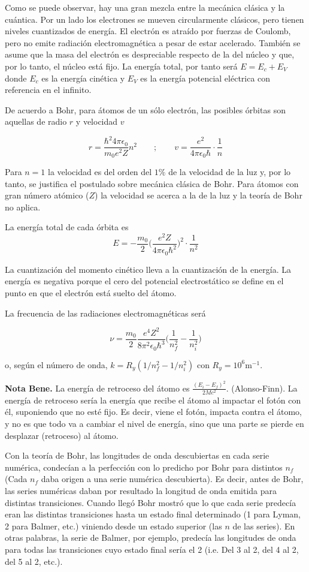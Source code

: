 \documentclass{article}
\begin{document}
Como se puede observar, hay una gran mezcla entre la mecánica clásica y la cuántica. Por un lado los electrones se mueven circularmente clásicos, pero tienen niveles cuantizados de energía. El electrón es atraído por fuerzas de Coulomb, pero no emite radiación electromagnética a pesar de estar acelerado. También se asume que la masa del electrón es despreciable respecto de la del núcleo y que, por lo tanto, el núcleo está fijo. La energía total, por tanto será $E = E_{c} + E_{V}$ donde $E_{c}$ es la energía cinética y $E_{V}$ es la energía potencial eléctrica con referencia en el infinito.

De acuerdo a Bohr, para átomos de un sólo electrón, las posibles órbitas son aquellas de radio $r$ y velocidad $v$ 

\[ r=\frac{\hbar^{2}4\pi \epsilon_{0}}{m_{0}e^{2}Z} n^{2} \qquad ; \qquad v=\frac{e^{2}}{4 \pi \epsilon_{0} \hbar} \cdot \frac{1}{n}\]

Para $n=1$ la velocidad es del orden del $1\%$ de la velocidad de la luz y, por lo tanto, se justifica el postulado sobre mecánica clásica de Bohr. Para átomos con gran número atómico ($Z$) la velocidad se acerca a la de la luz y la teoría de Bohr no aplica.

La energía total de cada órbita es 
\[ E = - \frac{m_{0}}{2} \bigg( \frac{e^{2}Z}{4 \pi \epsilon_{0} \hbar^{2}} \bigg)^{2} \cdot \frac{1}{n^{2}}\]

La cuantización del momento cinético lleva a la cuantización de la energía. La energía es negativa porque el cero del potencial electrostático se define en el punto en que el electrón está suelto del átomo.

La frecuencia de las radiaciones electromagnéticas será 

\[ \nu = \frac{m_{0}}{2} \frac{e^{4}Z^{2}}{8 \pi^{2} \epsilon_{0} \hbar^{3}} \bigg( \frac{1}{n_{f}^{2}} - \frac{1}{n_{i}^{2}} \bigg) \]

o, según el número de onda, $k=R_{y}(1/n_{f}^{2}-1/n_{i}^{2})$ con $R_{y}=10^{6}\textrm{m}^{-1}$.

\textbf{Nota Bene.} La energía de retroceso del átomo es $\frac{(E_{i}-E_{f})^{2}}{2Mc^{2}}$. (Alonso-Finn). La energía de retroceso sería la energía que recibe el átomo al impactar el fotón con él, suponiendo que no esté fijo. Es decir, viene el fotón, impacta contra el átomo, y no es que todo va a cambiar el nivel de energía, sino que una parte se pierde en desplazar (retroceso) al átomo.

Con la teoría de Bohr, las longitudes de onda descubiertas en cada serie numérica, condecían a la perfección con lo predicho por Bohr para distintos $n_{f}$ (Cada $n_{f}$ daba origen a una serie numérica descubierta). Es decir, antes de Bohr, las series numéricas daban por resultado la longitud de onda emitida para distintas transiciones. Cuando llegó Bohr mostró que lo que cada serie predecía eran las distintas transiciones hasta un estado final determinado (1 para Lyman, 2 para Balmer, etc.) viniendo desde un estado superior (las $n$ de las series). En otras palabras, la serie de Balmer, por ejemplo, predecía las longitudes de onda para todas las transiciones cuyo estado final sería el 2 (i.e. Del 3 al 2, del 4 al 2, del 5 al 2, etc.).
\end{document}
